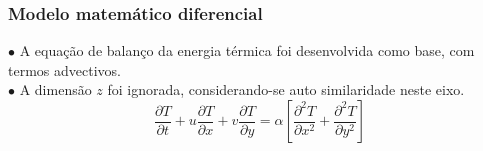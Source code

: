 \documentclass[xcolor=dvipsnames,10pt,aspectratio=169]{beamer}
\begin{document}
	



	\begin{frame} 
		\frametitle{Modelo matemático diferencial}
		$\bullet$ A equação de balanço da energia térmica foi desenvolvida como base, com termos advectivos.\\
		$\bullet$ A dimensão $z$ foi ignorada, considerando-se auto similaridade neste eixo.\\
	
		\begin{equation}
			\frac{\partial T}{\partial t} + u \frac{\partial T}{\partial x} + v \frac{\partial T}{\partial y} = \alpha \left[  \frac{\partial^2 T}{\partial x^2} + \frac{\partial^2 T}{\partial y^2}   \right] 
		\end{equation}

	\end{frame}
\end{document}
